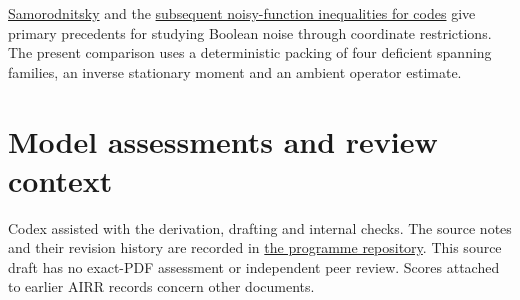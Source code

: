 \documentclass[11pt]{article}
\begin{document}
\href{https://arxiv.org/abs/1809.09696}{Samorodnitsky} and the \href{https://arxiv.org/abs/2508.06940}{subsequent noisy-function inequalities for codes} give primary precedents for studying Boolean noise through coordinate restrictions. The present comparison uses a deterministic packing of four deficient spanning families, an inverse stationary moment and an ambient operator estimate.

\section*{Model assessments and review context}
Codex assisted with the derivation, drafting and internal checks. The source notes and their revision history are recorded in \href{https://github.com/lluiseriksson/THE-ERIKSSON-PROGRAMME/pull/292}{the programme repository}. This source draft has no exact-PDF assessment or independent peer review. Scores attached to earlier AIRR records concern other documents.
\end{document}

